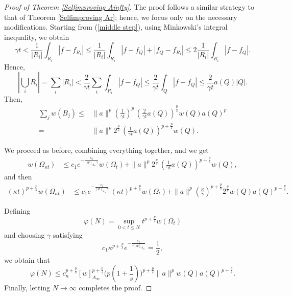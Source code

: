 \documentclass[reqno, 10pt, oneside]{amsart}
\numberwithin{equation}{section}
\numberwithin{theorem}{section}
\newcommand{\1}{{\rm 1\hspace*{-0.4ex}%
\rule{0.1ex}{1.52ex}\hspace*{0.2ex}}}
\begin{document}
\begin{proof}[Proof of Theorem \ref{Selfimproving Ainfty}]


%
The proof follows a similar strategy to that of Theorem \ref{Selfimproving Ar}; hence, we focus only on the necessary modifications.
Starting from (\ref{middle step}), using Minkowski's integral inequality, we obtain
\begin{equation*}
	\gamma t < \frac{1}{|R_i|}\int_{R_i}|f-f_{R_i}|  \leq \frac{1}{|R_i|}\int_{R_i} |f-f_{Q}| + |f_Q-f_{R_i}|
\leq  2\frac{1}{|R_i|}\int_{R_i}|f-f_{Q}|.
\end{equation*}
Hence,
\begin{equation*}
	\left| \bigcup_iR_i\right| =\sum_i |R_i| < \frac{2}{\gamma t} \sum_i \int_{R_i}|f-f_{Q}|
\leq \frac{2}{\gamma t} \int_{Q}|f-f_{Q}| \leq \frac{2}{\gamma t} a(Q)|Q|.
\end{equation*}
Then, 
\begin{align*}
	\sum_j w(B_j)  \leq &  \|a\|^p \left( \frac{1}{\gamma t}\right)^p \, \left( \frac{2}{\gamma t} a(Q)\right )^{ \frac{p}{s} } w(Q) a(Q)^p\\
= & \|a\|^p 2^{\frac{p}{s}}  \,  \left( \frac{1}{\gamma t} a(Q)\right )^{ p+\frac{p}{s} } w(Q).
\end{align*}

We proceed as before, combining everything together, and we get
\begin{align*}
 w(\Omega_{\kappa t}) & \leq c_1 e^{-\frac{c_2}{ [w]_{A_{\infty}}\gamma } }w(\Omega_t) + 
\|a\|^p 2^{\frac{p}{s}}  \,  \left( \frac{1}{\gamma t} a(Q)\right )^{ p+\frac{p}{s} } w(Q),
\end{align*}
and then 
\begin{align*}
(\kappa t)^{p+\frac{p}{s}} w(\Omega_{\kappa t}) & \leq c_1 e^{-\frac{c_2}{ [w]_{A_{\infty}}\gamma } }\, (\kappa t)^{p+\frac{p}{s}}w(\Omega_t) + 
\|a\|^p \left( \frac{\kappa}{\gamma }\right)^{p+\frac{p}{s}}  2^{\frac{p}{s}} 
w(Q) a(Q)^{p+\frac{p}{s}}.
\end{align*}

Defining
\begin{equation*}
	\varphi(N) = \sup_{0<t\leq N} t^{p + \frac{p}{s}} w(\Omega_t)
\end{equation*}
and choosing $\gamma$ satisfying
\begin{equation*}
	c_1 \kappa^{p+\frac{p}{s}} e^{-\frac{c_2}{\gamma [w]_{A_{\infty}}}}=\frac 12,
\end{equation*}
we obtain that 
%
\begin{equation*}
	\varphi(N) \leq c_n^{p+\frac{p}{s}}[w]_{A_\infty}^{p+\frac{p}{s}} \Big(p(1+\frac{1}{s})\Big)^{p+\frac{p}{s}}\|a\|^{p} w(Q) a(Q)^{p+\frac{p}{s}}. 
\end{equation*}
%
Finally, letting $N \to \infty$ completes the proof. 
\end{proof}
\end{document}
